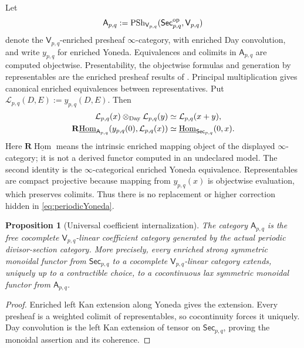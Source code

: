 \documentclass[11pt]{amsart}
\newtheorem{proposition}[theorem]{Proposition}
\theoremstyle{definition}
\theoremstyle{remark}
\begin{document}
Let
\begin{equation}\label{eq:periodicCoefficientCategory}
 \mathsf A_{p,q}:=\operatorname{PSh}_{\mathsf V_{p,q}}
 (\mathsf{Sec}_{p,q}^{\rm op},\mathsf V_{p,q})
\end{equation}
denote the $\mathsf V_{p,q}$-enriched presheaf $\infty$-category, with
enriched Day convolution, and write $y_{p,q}$ for enriched Yoneda.
Equivalences and colimits in $\mathsf A_{p,q}$ are computed objectwise.
Presentability, the objectwise formulas and generation by representables are
the enriched presheaf results of
\cite[Theorem~1.2 and Corollaries~1.4--1.5]{BermanEnriched}.
Principal multiplication gives canonical enriched equivalences between
representatives.  Put $\mathcal L_{p,q}(D,E):=y_{p,q}(D,E)$.  Then
\begin{align}\label{eq:periodicYoneda}
 \mathcal L_{p,q}(x)\otimes_{\rm Day}\mathcal L_{p,q}(y)
   &\simeq\mathcal L_{p,q}(x+y),\\
 \mathbf R\underline{\operatorname{Hom}}_{\mathsf A_{p,q}}
 (y_{p,q}(0),\mathcal L_{p,q}(x))
   &\simeq\underline{\operatorname{Hom}}_{\mathsf{Sec}_{p,q}}(0,x).
\end{align}
Here $\mathbf R\underline{\operatorname{Hom}}$ means the intrinsic enriched
mapping object of the displayed $\infty$-category; it is not a derived
functor computed in an undeclared model.  The second identity is the
$\infty$-categorical enriched Yoneda equivalence.  Representables are
compact projective because mapping from $y_{p,q}(x)$ is objectwise
evaluation, which preserves colimits.  Thus there is no replacement or
higher correction hidden in \eqref{eq:periodicYoneda}.

\begin{proposition}[Universal coefficient internalization]
\label{prop:periodicUniversalInternalization}
The category $\mathsf A_{p,q}$ is the free cocomplete
$\mathsf V_{p,q}$-linear coefficient category generated by the actual
periodic divisor-section category.  More precisely, every enriched strong
symmetric monoidal functor from $\mathsf{Sec}_{p,q}$ to a cocomplete
$\mathsf V_{p,q}$-linear category extends, uniquely up to a contractible
choice, to a cocontinuous lax symmetric monoidal functor from
$\mathsf A_{p,q}$.
\end{proposition}

\begin{proof}
Enriched left Kan extension along Yoneda gives the extension.  Every
presheaf is a weighted colimit of representables, so cocontinuity forces it
uniquely.  Day convolution is the left Kan extension of tensor on
$\mathsf{Sec}_{p,q}$, proving the monoidal assertion and its coherence.
\end{proof}
\end{document}
